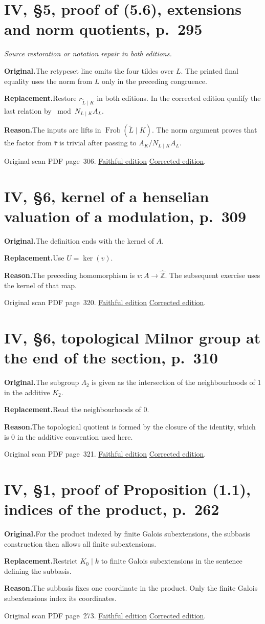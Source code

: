 \documentclass[11pt,a4paper]{article}
\newcommand{\original}{\par\smallskip\noindent\textbf{Original.}\enspace}
\newcommand{\replacement}{\par\smallskip\noindent\textbf{Replacement.}\enspace}
\newcommand{\reason}{\par\smallskip\noindent\textbf{Reason.}\enspace}
\newcommand{\editionlink}[3]{\href{#1\#errata.#2}{#3}}
\newcommand{\location}[2]{%
  \par\smallskip\noindent Original scan PDF page~#2.\enspace
  \editionlink{Neukirch_Faithful.pdf}{#1}{Faithful edition}
  \quad\editionlink{Neukirch_Corrected.pdf}{#1}{Corrected edition}.}
\begin{document}
\setcounter{section}{109}
\section{IV, \S5, proof of (5.6), extensions and norm quotients, p.~295}\label{errata:item:110}
\noindent\emph{Source restoration or notation repair in both editions.}\par
\original The retypeset line omits the four tildes over $L$. The printed final equality uses the norm from $L$ only in the preceding congruence.
\replacement Restore $r_{\widetilde L\mid K}$ in both editions. In the corrected edition qualify the last relation by $\bmod N_{L\mid K}A_L$.
\reason The inputs are lifts in $\operatorname{Frob}(\widetilde L\mid K)$. The norm argument proves that the factor from $\bar\tau$ is trivial after passing to $A_K/N_{L\mid K}A_L$.
\location{110}{306}

\setcounter{section}{110}
\section{IV, \S6, kernel of a henselian valuation of a modulation, p.~309}\label{errata:item:111}

\original The definition ends with the kernel of $A$.
\replacement Use $U=\ker(v)$.
\reason The preceding homomorphism is $v:A\to\widehat{\mathbb Z}$. The subsequent exercise uses the kernel of that map.
\location{111}{320}

\setcounter{section}{111}
\section{IV, \S6, topological Milnor group at the end of the section, p.~310}\label{errata:item:112}

\original The subgroup $\Lambda_2$ is given as the intersection of the neighbourhoods of $1$ in the additive $K_2$.
\replacement Read the neighbourhoods of $0$.
\reason The topological quotient is formed by the closure of the identity, which is $0$ in the additive convention used here.
\location{112}{321}

\setcounter{section}{112}
\section{IV, \S1, proof of Proposition (1.1), indices of the product, p.~262}\label{errata:item:113}

\original For the product indexed by finite Galois subextensions, the subbasis construction then allows all finite subextensions.
\replacement Restrict $K_0\mid k$ to finite Galois subextensions in the sentence defining the subbasis.
\reason The subbasis fixes one coordinate in the product. Only the finite Galois subextensions index its coordinates.
\location{113}{273}
\end{document}
